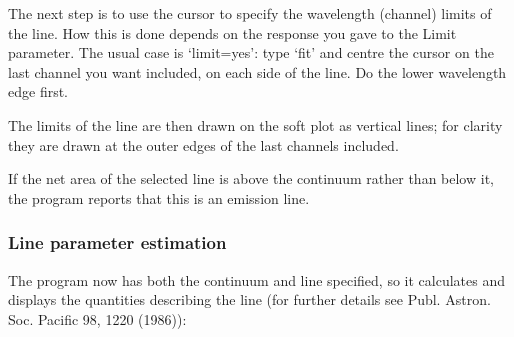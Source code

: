    The next step is to use the cursor to specify the wavelength
   (channel) limits of the line. How this is done depends on the
   response you gave to the Limit parameter. The usual case is
   `limit=yes': type `fit' and centre the cursor on the last channel you
   want included, on each side of the line. Do the lower wavelength edge
   first.

   The limits of the line are then drawn on the soft plot as vertical
   lines; for clarity they are drawn at the outer edges of the last
   channels included.

   If the net area of the selected line is above the continuum rather
   than below it, the program reports that this is an emission line.


\subsubsection{\label{techno11linepars}Line parameter estimation}

   The program now has both the continuum and line specified, so it
   calculates and displays the quantities describing the line (for
   further details see Publ. Astron. Soc. Pacific 98, 1220 (1986)):

